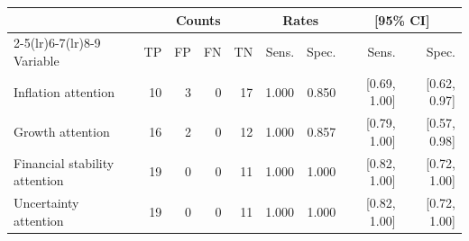 \begin{tabular}{lrrrr rr rr}
\toprule
 & \multicolumn{4}{c}{Counts} & \multicolumn{2}{c}{Rates} & \multicolumn{2}{c}{[95\% CI]} \\
\cmidrule(lr){2-5}\cmidrule(lr){6-7}\cmidrule(lr){8-9}
Variable & TP & FP & FN & TN & Sens. & Spec. & Sens. & Spec. \\
\midrule
Inflation attention & 10 & 3 & 0 & 17 & 1.000 & 0.850 & [0.69, 1.00] & [0.62, 0.97] \\
Growth attention & 16 & 2 & 0 & 12 & 1.000 & 0.857 & [0.79, 1.00] & [0.57, 0.98] \\
Financial stability attention & 19 & 0 & 0 & 11 & 1.000 & 1.000 & [0.82, 1.00] & [0.72, 1.00] \\
Uncertainty attention & 19 & 0 & 0 & 11 & 1.000 & 1.000 & [0.82, 1.00] & [0.72, 1.00] \\
\bottomrule
\end{tabular}

